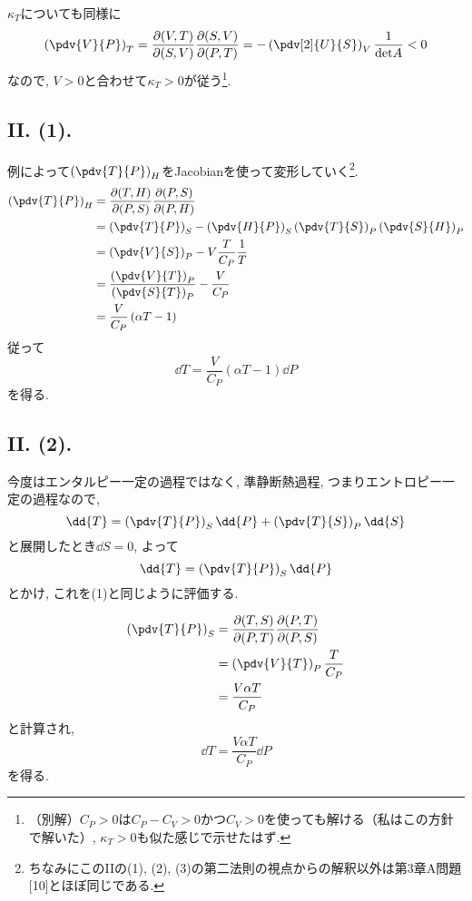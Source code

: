 $\kappa_T$についても同様に
\begin{equation}
  \left( \pdv{V}{P} \right)_T=\frac{\partial (V,T)}{\partial (S,V)}\frac{\partial (S,V)}{\partial (P,T)}=-\left( \pdv[2]{U}{S} \right)_V\frac{1}{\text{det}{A}}<0
\end{equation}
なので, $V>0$と合わせて$\kappa_T>0$が従う\footnote{（別解）$C_P>0$は$C_P-C_V>0$かつ$C_V>0$を使っても解ける（私はこの方針で解いた）, $\kappa_T>0$も似た感じで示せたはず. }. 

\subsection*{II. (1). }
例によって$\left( \pdv{T}{P} \right)_H$をJacobianを使って変形していく\footnote{ちなみにこのIIの(1), (2), (3)の第二法則の視点からの解釈以外は\cite{Kubo}第3章A問題[10]とほぼ同じである. }. 
\begin{align*}
  \left( \pdv{T}{P} \right)_H&=\frac{\partial (T,H)}{\partial (P,S)}\frac{\partial (P,S)}{\partial (P,H)}\\
  &=\left( \pdv{T}{P} \right)_S-\left( \pdv{H}{P} \right)_S\left( \pdv{T}{S} \right)_P\left( \pdv{S}{H} \right)_P\\
  &=\left( \pdv{V}{S} \right)_P-V\frac{T}{C_P}\frac{1}{T}\\
  &=\frac{\left( \pdv{V}{T} \right)_P}{\left( \pdv{S}{T} \right)_P}-\frac{V}{C_P}\\
  &=\frac{V}{C_P}\left( \alpha T-1 \right)
\end{align*}
従って
\begin{equation}
  \dd{T}=\frac{V}{C_P}\left( \alpha T-1 \right)\dd{P}
\end{equation}
を得る. 

\subsection*{II. (2). }
今度はエンタルピー一定の過程ではなく, 準静断熱過程, つまりエントロピー一定の過程なので, 
\begin{equation}
  \dd{T}=\left( \pdv{T}{P} \right)_S\dd{P}+\left( \pdv{T}{S} \right)_P\dd{S}\label{stat_pbII_dTtenkai}
\end{equation}
と展開したとき$\dd{S}=0$, よって
\begin{equation}
  \dd{T}=\left( \pdv{T}{P} \right)_S\dd{P}
\end{equation}
とかけ, これを(1)と同じように評価する. 

\begin{align*}
  \left( \pdv{T}{P} \right)_S&=\frac{\partial (T,S)}{\partial (P,T)}\frac{\partial (P,T)}{\partial (P,S)}\\
  &=\left( \pdv{V}{T} \right)_P\frac{T}{C_P}\\
  &=\frac{V\alpha T}{C_P}
\end{align*}
と計算され, 
\begin{equation}
  \dd{T}=\frac{V\alpha T}{C_P}\dd{P}
\end{equation}
を得る. 

